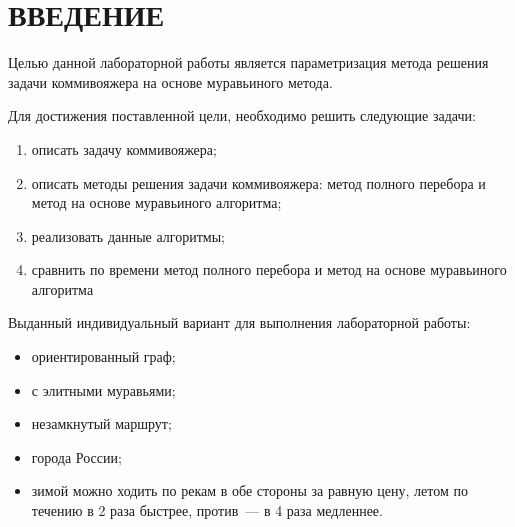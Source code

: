 \chapter*{ВВЕДЕНИЕ}

Целью данной лабораторной работы является параметризация метода решения задачи коммивояжера на основе муравьиного метода.

Для достижения поставленной цели, необходимо решить следующие задачи:
\begin{enumerate}[label={\arabic*)}]
    \item описать задачу коммивояжера;
    \item описать методы решения задачи коммивояжера: метод полного перебора и метод на основе муравьиного алгоритма;
    \item реализовать данные алгоритмы;
    \item сравнить по времени метод полного перебора и метод на основе муравьиного алгоритма
\end{enumerate}

Выданный индивидуальный вариант для выполнения лабораторной работы:
\begin{itemize}
	\item ориентированный граф;
	\item с элитными муравьями;
	\item незамкнутый маршрут;
	\item города России;
	\item зимой можно ходить по рекам в обе стороны за равную цену, летом по течению в 2 раза быстрее, против~--- в 4 раза медленнее.
\end{itemize}